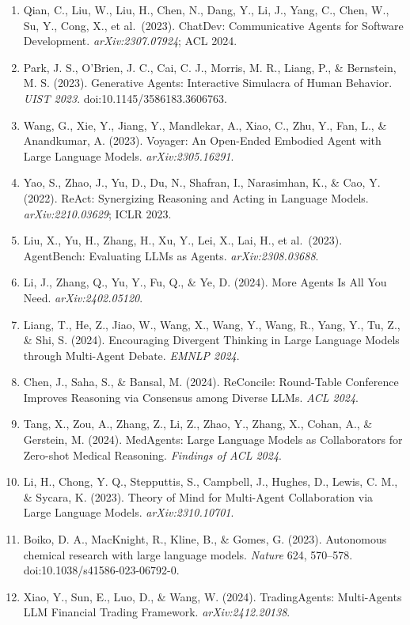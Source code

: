 \begin{enumerate}
\item
  Qian, C., Liu, W., Liu, H., Chen, N., Dang, Y., Li, J., Yang, C., Chen, W., Su, Y., Cong, X., et al.~(2023). ChatDev: Communicative Agents for Software Development. \emph{arXiv:2307.07924}; ACL 2024.
\item
  Park, J. S., O'Brien, J. C., Cai, C. J., Morris, M. R., Liang, P., \& Bernstein, M. S. (2023). Generative Agents: Interactive Simulacra of Human Behavior. \emph{UIST 2023}. doi:10.1145/3586183.3606763.
\item
  Wang, G., Xie, Y., Jiang, Y., Mandlekar, A., Xiao, C., Zhu, Y., Fan, L., \& Anandkumar, A. (2023). Voyager: An Open-Ended Embodied Agent with Large Language Models. \emph{arXiv:2305.16291}.
\item
  Yao, S., Zhao, J., Yu, D., Du, N., Shafran, I., Narasimhan, K., \& Cao, Y. (2022). ReAct: Synergizing Reasoning and Acting in Language Models. \emph{arXiv:2210.03629}; ICLR 2023.
\item
  Liu, X., Yu, H., Zhang, H., Xu, Y., Lei, X., Lai, H., et al.~(2023). AgentBench: Evaluating LLMs as Agents. \emph{arXiv:2308.03688}.
\item
  Li, J., Zhang, Q., Yu, Y., Fu, Q., \& Ye, D. (2024). More Agents Is All You Need. \emph{arXiv:2402.05120}.
\item
  Liang, T., He, Z., Jiao, W., Wang, X., Wang, Y., Wang, R., Yang, Y., Tu, Z., \& Shi, S. (2024). Encouraging Divergent Thinking in Large Language Models through Multi-Agent Debate. \emph{EMNLP 2024}.
\item
  Chen, J., Saha, S., \& Bansal, M. (2024). ReConcile: Round-Table Conference Improves Reasoning via Consensus among Diverse LLMs. \emph{ACL 2024}.
\item
  Tang, X., Zou, A., Zhang, Z., Li, Z., Zhao, Y., Zhang, X., Cohan, A., \& Gerstein, M. (2024). MedAgents: Large Language Models as Collaborators for Zero-shot Medical Reasoning. \emph{Findings of ACL 2024}.
\item
  Li, H., Chong, Y. Q., Stepputtis, S., Campbell, J., Hughes, D., Lewis, C. M., \& Sycara, K. (2023). Theory of Mind for Multi-Agent Collaboration via Large Language Models. \emph{arXiv:2310.10701}.
\item
  Boiko, D. A., MacKnight, R., Kline, B., \& Gomes, G. (2023). Autonomous chemical research with large language models. \emph{Nature} 624, 570--578. doi:10.1038/s41586-023-06792-0.
\item
  Xiao, Y., Sun, E., Luo, D., \& Wang, W. (2024). TradingAgents: Multi-Agents LLM Financial Trading Framework. \emph{arXiv:2412.20138}.

\end{enumerate}
